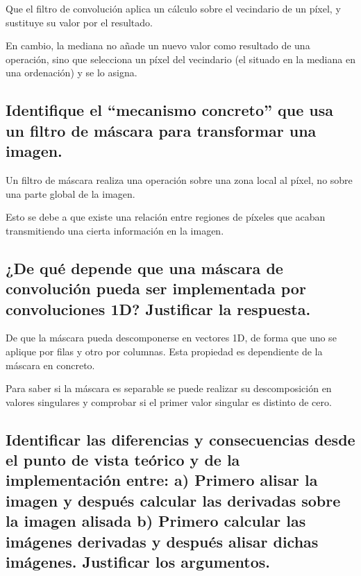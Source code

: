 \documentclass[11pt]{scrartcl} %
\begin{document}
Que el filtro de convolución aplica un cálculo sobre el vecindario de un píxel,
y sustituye su valor por el resultado.\newline

En cambio, la mediana no añade un nuevo valor como resultado de una operación, 
sino que selecciona un
píxel del vecindario (el situado en la mediana en una ordenación) y se lo asigna.

\subsection{Identifique el “mecanismo concreto” que usa un filtro de máscara 
para transformar una imagen.}

Un filtro de máscara realiza una operación sobre una zona local al píxel, no sobre
una parte global de la imagen.\newline

Esto se debe a que existe una relación entre regiones de píxeles que acaban
transmitiendo una cierta información en la imagen.


\subsection{¿De qué depende que una máscara de convolución pueda ser 
implementada por convoluciones 1D? Justificar la respuesta.}

De que la máscara pueda descomponerse en vectores 1D, de forma que uno se
aplique por filas y otro por columnas. Esta propiedad es dependiente de
la máscara en concreto.\newline

Para saber si la máscara es separable se puede realizar su descomposición en 
valores singulares y comprobar si el primer valor singular es distinto de cero.


\subsection{Identificar las diferencias y consecuencias desde el punto de
vista teórico y de la implementación entre:\newline
a) Primero alisar la imagen y después calcular las derivadas sobre la imagen 
alisada\newline
b) Primero calcular las imágenes derivadas y después alisar dichas imágenes.\newline
Justificar los argumentos.}
\end{document}
